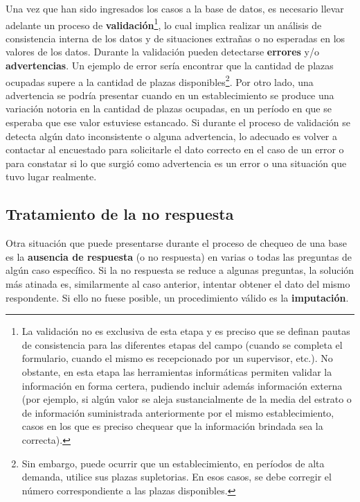 \documentclass[
]{book}
\begin{document}
Una vez que han sido ingresados los casos a la base de datos, es necesario llevar adelante un proceso de \textbf{validación}\footnote{La validación no es exclusiva de esta etapa y es preciso que se definan pautas de consistencia para las diferentes etapas del campo (cuando se completa el formulario, cuando el mismo es recepcionado por un supervisor, etc.). No obstante, en esta etapa las herramientas informáticas permiten validar la información en forma certera, pudiendo incluir además información externa (por ejemplo, si algún valor se aleja sustancialmente de la media del estrato o de información suministrada anteriormente por el mismo establecimiento, casos en los que es preciso chequear que la información brindada sea la correcta).}, lo cual implica realizar un análisis de consistencia interna de los datos y de situaciones extrañas o no esperadas en los valores de los datos. Durante la validación pueden detectarse \textbf{errores} y/o \textbf{advertencias}. Un ejemplo de error sería encontrar que la cantidad de plazas ocupadas supere a la cantidad de plazas disponibles\footnote{Sin embargo, puede ocurrir que un establecimiento, en períodos de alta demanda, utilice sus plazas supletorias. En esos casos, se debe corregir el número correspondiente a las plazas disponibles.}. Por otro lado, una advertencia se podría presentar cuando en un establecimiento se produce una variación notoria en la cantidad de plazas ocupadas, en un período en que se esperaba que ese valor estuviese estancado. Si durante el proceso de validación se detecta algún dato inconsistente o alguna advertencia, lo adecuado es volver a contactar al encuestado para solicitarle el dato correcto en el caso de un error o para constatar si lo que surgió como advertencia es un error o una situación que tuvo lugar realmente.

\hypertarget{tratamiento-de-la-no-respuesta}{%
\subsection{Tratamiento de la no respuesta}\label{tratamiento-de-la-no-respuesta}}

Otra situación que puede presentarse durante el proceso de chequeo de una base es la \textbf{ausencia de respuesta} (o no respuesta) en varias o todas las preguntas de algún caso específico. Si la no respuesta se reduce a algunas preguntas, la solución más atinada es, similarmente al caso anterior, intentar obtener el dato del mismo respondente. Si ello no fuese posible, un procedimiento válido es la \textbf{imputación}.
\end{document}
